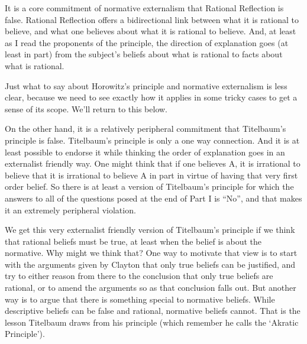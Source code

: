 It is a core commitment of normative externalism that Rational Reflection is false. Rational Reflection offers a bidirectional link between what it is rational to believe, and what one believes about what it is rational to believe. And, at least as I read the proponents of the principle, the direction of explanation goes (at least in part) from the subject's beliefs about what is rational to facts about what is rational.

Just what to say about Horowitz's principle and normative externalism is less clear, because we need to see exactly how it applies in some tricky cases to get a sense of its scope. We'll return to this below.

On the other hand, it is a relatively peripheral commitment that Titelbaum's principle is false. Titelbaum's principle is only a one way connection. And it is at least possible to endorse it while thinking the order of explanation goes in an externalist friendly way. One might think that if one believes A, it is irrational to believe that it is irrational to believe A in part in virtue of having that very first order belief. So there is at least a version of Titelbaum's principle for which the answers to all of the questions posed at the end of Part I is ``No'', and that makes it an extremely peripheral violation.

We get this very externalist friendly version of Titelbaum's principle if we think that rational beliefs must be true, at least when the belief is about the normative. Why might we think that? One way to motivate that view is to start with the arguments given by Clayton \citet{Littlejohn2012} that only true beliefs can be justified, and try to either reason from there to the conclusion that only true beliefs are rational, or to amend the arguments so as that conclusion falls out. But another way is to argue that there is something special to normative beliefs. While descriptive beliefs can be false and rational, normative beliefs cannot. That is the lesson Titelbaum draws from his principle (which remember he calls the `Akratic Principle').

